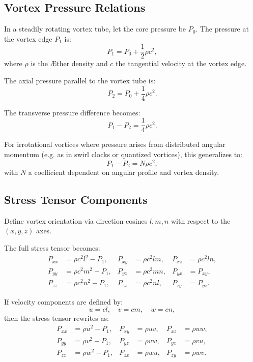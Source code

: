 \documentclass[a4paper,12pt]{article}
\begin{document}
    \subsection{Vortex Pressure Relations}
    In a steadily rotating vortex tube, let the core pressure be \(P_0\). The pressure at the vortex edge \(P_1\) is:
    \begin{equation}
        P_1 = P_0 + \frac{1}{2} \rho c^2,
    \end{equation}
    where \(\rho\) is the Æther density and \(c\) the tangential velocity at the vortex edge.

    The axial pressure parallel to the vortex tube is:
    \begin{equation}
        P_2 = P_0 + \frac{1}{4} \rho c^2.
    \end{equation}

    The transverse pressure difference becomes:
    \begin{equation}
        P_1 - P_2 = \frac{1}{4} \rho c^2.
    \end{equation}

    For irrotational vortices where pressure arises from distributed angular momentum (e.g. as in swirl clocks or quantized vortices), this generalizes to:
    \begin{equation}
        P_1 - P_2 = N \rho c^2,
    \end{equation}
    with \(N\) a coefficient dependent on angular profile and vortex density.

    \subsection{Stress Tensor Components}
    Define vortex orientation via direction cosines \(l, m, n\) with respect to the \((x, y, z)\) axes.

    The full stress tensor becomes:
    \begin{align}
        P_{xx} &= \rho c^2 l^2 - P_1, & P_{xy} &= \rho c^2 l m, & P_{xz} &= \rho c^2 l n, \\
        P_{yy} &= \rho c^2 m^2 - P_1, & P_{yz} &= \rho c^2 m n, & P_{yx} &= P_{xy}, \\
        P_{zz} &= \rho c^2 n^2 - P_1, & P_{zx} &= \rho c^2 n l, & P_{zy} &= P_{yz}.
    \end{align}

    If velocity components are defined by:
    \begin{equation}
        u = c l, \quad v = c m, \quad w = c n,
    \end{equation}
    then the stress tensor rewrites as:
    \begin{align}
        P_{xx} &= \rho u^2 - P_1, & P_{xy} &= \rho u v, & P_{xz} &= \rho u w, \\
        P_{yy} &= \rho v^2 - P_1, & P_{yz} &= \rho v w, & P_{yx} &= \rho v u, \\
        P_{zz} &= \rho w^2 - P_1, & P_{zx} &= \rho w u, & P_{zy} &= \rho w v.
    \end{align}
\end{document}
